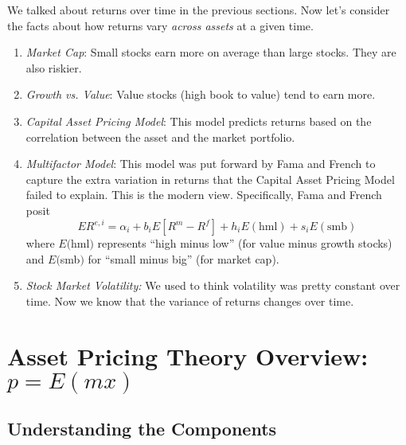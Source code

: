 \documentclass[12pt]{article}
\theoremstyle{plain}
\theoremstyle{definition}
\theoremstyle{remark}
\begin{document}
We talked about returns over time in the previous sections. Now
let's consider the facts about how returns vary \emph{across assets}
at a given time.
\begin{enumerate}
    \item {\sl Market Cap}: Small stocks earn more on average than
	large stocks.  They are also riskier.
    \item {\sl Growth vs. Value}: Value stocks (high book to value)
	tend to earn more.
    \item {\sl Capital Asset Pricing Model}: This model predicts
	returns based on the correlation between the asset and
	the market portfolio.
    \item {\sl Multifactor Model}: This model was put forward by
	Fama and French to capture the extra variation in returns
	that the Capital Asset Pricing Model failed to explain.
	This is the modern view. Specifically, Fama and French posit
	\begin{equation}
	    \label{ff3fm}
	    ER^{e,i} = \alpha_i + b_iE[R^m - R^f] + h_i E(\text{hml})
		+ s_i E(\text{smb})
	\end{equation}
	where $E($hml$)$ represents ``high minus low'' (for
	value minus growth stocks)
	and $E($smb$)$ for ``small minus big'' (for market cap).
    \item {\sl Stock Market Volatility:} We used to think volatility
	was pretty constant over time.  Now we know that the
	variance of returns changes over time.
\end{enumerate}

\clearpage
\section{Asset Pricing Theory Overview: $p=E(mx)$}

\subsection{Understanding the Components}
\end{document}
